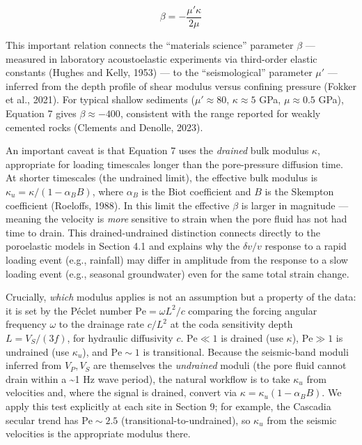 \documentclass[12pt]{article}
\begin{document}
\[\beta = -\frac{\mu' \kappa}{2\mu} \tag{7}\]

This important relation connects the ``materials science'' parameter
\(\beta\) --- measured in laboratory acoustoelastic experiments via
third-order elastic constants (Hughes and Kelly, 1953) --- to the
``seismological'' parameter \(\mu'\) --- inferred from the depth profile
of shear modulus versus confining pressure (Fokker et al., 2021). For
typical shallow sediments (\(\mu' \approx 80\), \(\kappa \approx 5\)
GPa, \(\mu \approx 0.5\) GPa), Equation 7 gives \(\beta \approx -400\),
consistent with the range reported for weakly cemented rocks (Clements
and Denolle, 2023).

An important caveat is that Equation 7 uses the \emph{drained} bulk
modulus \(\kappa\), appropriate for loading timescales longer than the
pore-pressure diffusion time. At shorter timescales (the undrained
limit), the effective bulk modulus is
\(\kappa_u = \kappa / (1 - \alpha_B B)\), where \(\alpha_B\) is the Biot
coefficient and \(B\) is the Skempton coefficient (Roeloffs, 1988). In
this limit the effective \(\beta\) is larger in magnitude --- meaning
the velocity is \emph{more} sensitive to strain when the pore fluid has
not had time to drain. This drained-undrained distinction connects
directly to the poroelastic models in Section 4.1 and explains why the
\(\delta v/v\) response to a rapid loading event (e.g., rainfall) may
differ in amplitude from the response to a slow loading event (e.g.,
seasonal groundwater) even for the same total strain change.

Crucially, \emph{which} modulus applies is not an assumption but a
property of the data: it is set by the Péclet number
\(\mathrm{Pe} = \omega L^2/c\) comparing the forcing angular frequency
\(\omega\) to the drainage rate \(c/L^2\) at the coda sensitivity depth
\(L = V_S/(3f)\), for hydraulic diffusivity \(c\). \(\mathrm{Pe} \ll 1\)
is drained (use \(\kappa\)), \(\mathrm{Pe} \gg 1\) is undrained (use
\(\kappa_u\)), and \(\mathrm{Pe}\sim 1\) is transitional. Because the
seismic-band moduli inferred from \(V_P, V_S\) are themselves the
\emph{undrained} moduli (the pore fluid cannot drain within a
\textasciitilde{}1 Hz wave period), the natural workflow is to take
\(\kappa_u\) from velocities and, where the signal is drained, convert
via \(\kappa = \kappa_u(1-\alpha_B B)\). We apply this test explicitly
at each site in Section 9; for example, the Cascadia secular trend has
\(\mathrm{Pe}\sim 2.5\) (transitional-to-undrained), so \(\kappa_u\)
from the seismic velocities is the appropriate modulus there.
\end{document}
